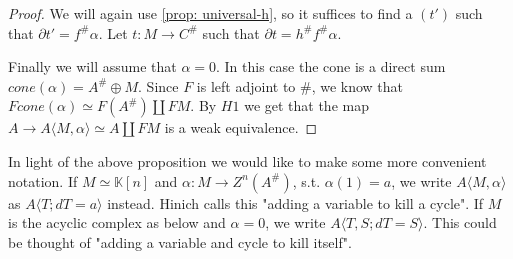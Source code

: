 \documentclass[../thesis.tex]{subfiles}
\begin{document}
\begin{proof}
                We will again use \ref{prop: universal-h}, so it suffices to find a $(t')$ such that $\partial t' = f^\#\alpha$. Let $t : M \rightarrow C^\#$ such that $\partial t = h^\# f^\# \alpha$. 

                Finally we will assume that $\alpha = 0$. In this case the cone is a direct sum $cone(\alpha) = A^\# \oplus M$. Since $F$ is left adjoint to $\#$, we know that $Fcone(\alpha) \simeq F(A^\#)\coprod FM$. By $H1$ we get that the map $A \rightarrow A\langle M,\alpha\rangle \simeq A\coprod FM$ is a weak equivalence.

            \end{proof}

            In light of the above proposition we would like to make some more convenient notation. If $M\simeq \mathbb{K}[n]$ and $\alpha: M \rightarrow Z^n(A^\#)$, s.t. $\alpha(1) = a$, we write $A\langle M,\alpha\rangle$ as $A\langle T; dT = a\rangle$ instead. Hinich calls this "adding a variable to kill a cycle". If $M$ is the acyclic complex as below and $\alpha = 0$, we write $A\langle T, S; dT = S\rangle$. This could be thought of "adding a variable and cycle to kill itself".

            \begin{center}
            \end{center}
\end{document}

